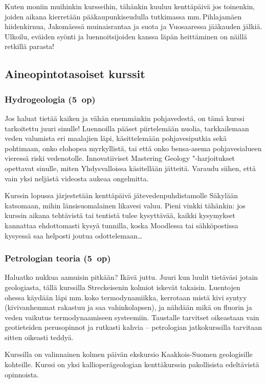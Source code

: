 \documentclass[../ala_hataile.tex]{subfiles}
\begin{document}
Kuten moniin muihinkin kursseihin, tähänkin kuuluu kenttäpäivä jos toinenkin, joiden aikana kierretään pää\-kaupunki\-seudulla tutkimassa mm.\,Pihlajamäen hiidenkirnua, Jako\-mäessä muinais\-rantaa ja suota ja Vuo\-saaressa jää\-kauden jälkiä. Ulkoilu, eväiden syönti ja luennoitsijoiden kanssa läpän heittäminen on näillä retkillä parasta!

\subsection*{Aineopintotasoiset kurssit}
\subsubsection*{Hydrogeologia (5~op)}
Jos haluat tietää kaiken ja vähän enemmänkin pohjavedestä, on tämä kurssi tarkoitettu juuri sinulle! Luennoilla pääset piirtelemään nuolia, tarkkailemaan veden valumista eri maalajien läpi, käsittelemään pohjavesiputkia sekä pohtimaan, onko elohopea myrkyllistä, tai että onko bensa-asema pohja\-vesi\-alueen vieressä riski veden\-otolle. Innovatiiviset Mastering Geology "-harjoitukset opettavat sinulle, miten Yhdys\-valloissa käsitellään jätteitä. Varaudu siihen, että vain yksi neljästä videosta aukeaa ongelmitta. 

Kurssin lopussa järjestetään kenttä\-päivä jäte\-veden\-puhdistamolle Säkylään katsomaan, mihin länsi\-suomalainen lika\-vesi valuu. Pieni vinkki tähänkin: jos kurssin aikana tehtävistä tai tentistä tulee kysyttävää, kaikki kysymykset kannattaa ehdottomasti kysyä tunnilla, koska Moodlessa tai sähkö\-postissa kysyessä saa helposti joutua odottelemaan\dots

\subsubsection*{Petrologian teoria (5~op)}
Haluatko nukkua aamuisin pitkään? Ikävä juttu. Juuri kun luulit tietäväsi jotain geologiasta, tällä kurssilla Streck\-eisenin kolmiot iskevät takaisin. Luentojen ohessa käydään läpi mm.\,koko termodynamiikka, kerrotaan mistä kivi syntyy (kivivanhemmat rakastuu ja saa vahinkolapsen), ja nähdään mikä on fluorin ja veden vaikutus termodynaamiseen systeemiin. Taustalle tarvitset oikeastaan vain geotieteiden perusopinnot ja rutkasti kahvia -- petrologian jatkokurssilla tarvitaan sitten oikeasti teddyä.

Kurssilla on valinnainen kolmen päivän ekskursio Kaakkois-Suomen geologisille kohteille. Kurssi on yksi kallio\-perä\-geologian kenttäkurssin pakollisista edeltävistä opinnoista.
\end{document}
